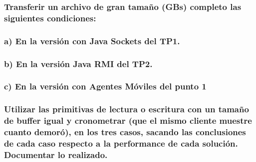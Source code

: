 \documentclass[11pt]{article}
\begin{document}
    \hypertarget{transferir-un-archivo-de-gran-tamauxf1o-gbs-completo-las-siguientes-condiciones}{%
\subsubsection{Transferir un archivo de gran tamaño (GBs) completo las
siguientes
condiciones:}\label{transferir-un-archivo-de-gran-tamauxf1o-gbs-completo-las-siguientes-condiciones}}

    \hypertarget{a-en-la-versiuxf3n-con-java-sockets-del-tp1.}{%
\subsubsection{a) En la versión con Java Sockets del
TP1.}\label{a-en-la-versiuxf3n-con-java-sockets-del-tp1.}}

    \hypertarget{b-en-la-versiuxf3n-java-rmi-del-tp2.}{%
\subsubsection{b) En la versión Java RMI del
TP2.}\label{b-en-la-versiuxf3n-java-rmi-del-tp2.}}

    \hypertarget{c-en-la-versiuxf3n-con-agentes-muxf3viles-del-punto-1}{%
\subsubsection{c) En la versión con Agentes Móviles del punto
1}\label{c-en-la-versiuxf3n-con-agentes-muxf3viles-del-punto-1}}

    \hypertarget{utilizar-las-primitivas-de-lectura-o-escritura-con-un-tamauxf1o-de-buffer-igual-y-cronometrar-que-el-mismo-cliente-muestre-cuanto-demoruxf3-en-los-tres-casos-sacando-las-conclusiones-de-cada-caso-respecto-a-la-performance-de-cada-soluciuxf3n.-documentar-lo-realizado.}{%
\subsubsection{Utilizar las primitivas de lectura o escritura con un
tamaño de buffer igual y cronometrar (que el mismo cliente muestre
cuanto demoró), en los tres casos, sacando las conclusiones de cada caso
respecto a la performance de cada solución. Documentar lo
realizado.}\label{utilizar-las-primitivas-de-lectura-o-escritura-con-un-tamauxf1o-de-buffer-igual-y-cronometrar-que-el-mismo-cliente-muestre-cuanto-demoruxf3-en-los-tres-casos-sacando-las-conclusiones-de-cada-caso-respecto-a-la-performance-de-cada-soluciuxf3n.-documentar-lo-realizado.}}
\end{document}
